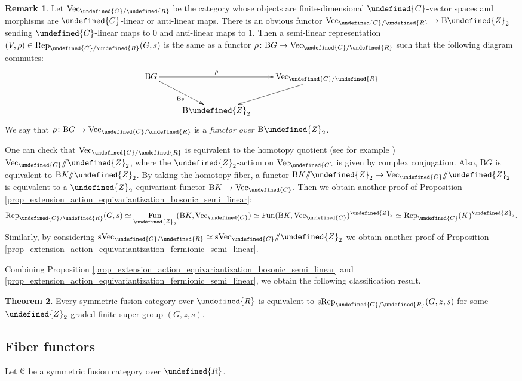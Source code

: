 \documentclass[10pt]{article}
\let\mathbb\undefined
\theoremstyle{definition}
\newtheorem{thm}{Theorem}[section]
\newtheorem{rem}[thm]{Remark}
\numberwithin{equation}{section}
\numberwithin{thm}{section}
\newcommand{\Cb}{\mathbb{C}}
\newcommand{\Rb}{\mathbb{R}}
\newcommand{\Zb}{\mathbb{Z}}
\newcommand{\CC}{\EuScript{C}}
\newcommand{\rmB}{\mathrm{B}}
\DeclareMathOperator{\fun}{Fun}
\newcommand{\vect}{\mathrm{Vec}}
\newcommand{\svect}{\mathrm{sVec}}
\newcommand{\rep}{\mathrm{Rep}}
\newcommand{\srep}{\mathrm{sRep}}
\newcommand{\dquotient}{/\mkern-6mu/}
\begin{document}
\begin{rem}
Let $\vect_{\Cb/\Rb}$ be the category whose objects are finite-dimensional $\Cb$-vector spaces and morphisms are $\Cb$-linear or anti-linear maps. There is an obvious functor $\vect_{\Cb/\Rb} \to \rmB \Zb_2$ sending $\Cb$-linear maps to $0$ and anti-linear maps to $1$. Then a semi-linear representation $(V,\rho) \in \rep_{\Cb/\Rb}(G,s)$ is the same as a functor $\rho \colon \rmB G \to \vect_{\Cb/\Rb}$ such that the following diagram commutes:
\[
\xymatrix{
\rmB G \ar[rr]^-{\rho} \ar[dr]_{\rmB s} & & \vect_{\Cb/\Rb} \ar[dl] \\
 & \rmB \Zb_2
}
\]
We say that $\rho \colon \rmB G \to \vect_{\Cb/\Rb}$ is a \emph{functor over $\rmB \Zb_2$}.

One can check that $\vect_{\Cb/\Rb}$ is equivalent to the homotopy quotient (see for example \cite[Section 3.2]{HXZ24}) $\vect_\Cb \dquotient \Zb_2$, where the $\Zb_2$-action on $\vect_\Cb$ is given by complex conjugation. Also, $\rmB G$ is equivalent to $\rmB K \dquotient \Zb_2$. By taking the homotopy fiber, a functor $\rmB K \dquotient \Zb_2 \to \vect_\Cb \dquotient \Zb_2$ is equivalent to a $\Zb_2$-equivariant functor $\rmB K \to \vect_\Cb$. Then we obtain another proof of Proposition \ref{prop_extension_action_equivariantization_bosonic_semi_linear}:
\[
\rep_{\Cb/\Rb}(G,s) \simeq \fun_{\Zb_2}(\rmB K,\vect_\Cb) \simeq \fun(\rmB K,\vect_\Cb)^{\Zb_2} \simeq \rep_\Cb(K)^{\Zb_2} .
\]
Similarly, by considering $\svect_{\Cb/\Rb} \simeq \svect_\Cb \dquotient \Zb_2$ we obtain another proof of Proposition \ref{prop_extension_action_equivariantization_fermionic_semi_linear}.
\end{rem}

Combining Proposition \ref{prop_extension_action_equivariantization_bosonic_semi_linear} and \ref{prop_extension_action_equivariantization_fermionic_semi_linear}, we obtain the following classification result.

\begin{thm} \label{thm_classification_symmetric_fusion_R}
Every symmetric fusion category over $\Rb$ is equivalent to $\srep_{\Cb/\Rb}(G,z,s)$ for some $\Zb_2$-graded finite super group $(G,z,s)$.
\end{thm}

\subsection{Fiber functors}

Let $\CC$ be a symmetric fusion category over $\Rb$.
\end{document}
